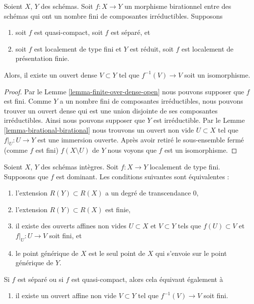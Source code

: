 \begin{lemma}
\label{lemma-birational-isomorphism-over-dense-open}
Soient $X$, $Y$ des schémas. Soit $f : X \to Y$ un morphisme birationnel
entre des schémas qui ont un nombre fini de composantes irréductibles.
Supposons
\begin{enumerate}
\item soit $f$ est quasi-compact, soit $f$ est séparé, et
\item soit $f$ est localement de type fini et $Y$ est réduit, soit $f$
est localement de présentation finie.
\end{enumerate}
Alors, il existe un ouvert dense $V \subset Y$
tel que $f^{-1}(V) \to V$ soit un isomorphisme.
\end{lemma}

\begin{proof}
Par le Lemme \ref{lemma-finite-over-dense-open} nous pouvons supposer que $f$ est fini. Comme $Y$
a un nombre fini de composantes irréductibles, nous pouvons trouver un ouvert dense
qui est une union disjointe de ses composantes irréductibles. Ainsi nous pouvons
supposer que $Y$ est irréductible. Par le Lemme \ref{lemma-birational-birational} nous trouvons un ouvert
non vide $U \subset X$ tel que $f|_U : U \to Y$ est une immersion ouverte. Après avoir retiré
le sous-ensemble fermé (comme $f$ est fini)
$f(X \setminus U)$ de $Y$ nous voyons que $f$ est un isomorphisme.
\end{proof}

\begin{lemma}
\label{lemma-finite-degree}
Soient $X$, $Y$ des schémas intègres.
Soit $f : X \to Y$ localement de type fini. Supposons que
$f$ est dominant. Les conditions
suivantes sont équivalentes :
\begin{enumerate}
\item l'extension $R(Y) \subset R(X)$ a un degré de transcendance
$0$,
\item l'extension $R(Y) \subset R(X)$ est finie,
\item il existe des ouverts affines non vides $U \subset X$
et $V \subset Y$ tels que $f(U) \subset V$
et $f|_U : U \to V$ soit fini, et
\item le point générique de $X$ est le seul point de $X$ qui s'envoie
sur le point générique de $Y$.
\end{enumerate}
Si $f$ est séparé ou si $f$ est quasi-compact, alors cela équivaut
également à
\begin{enumerate}
\item[(5)] il existe un ouvert affine non vide $V \subset Y$ tel
que $f^{-1}(V) \to V$ soit fini.
\end{enumerate}
\end{lemma}

